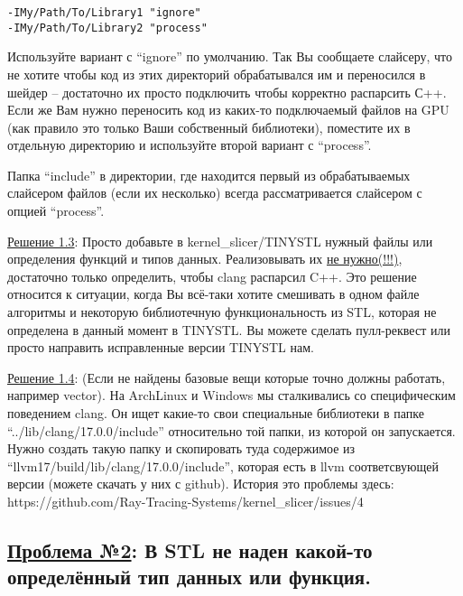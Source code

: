 \documentclass[11pt,fleqn,english,russian]{report} %
\begin{document}
\begin{lstlisting}[caption=добавляем новый подключаемый файл, 
	label=lst:addincludes]	
-IMy/Path/To/Library1 "ignore"
-IMy/Path/To/Library2 "process"
\end{lstlisting}

Используйте вариант с ``ignore'' по умолчанию. Так Вы сообщаете слайсеру, что не хотите чтобы код из этих директорий обрабатывался им и переносился в шейдер -- достаточно их просто подключить чтобы корректно распарсить С++. Если же Вам нужно переносить код из каких-то подключаемый файлов на GPU (как правило это только Ваши собственный библиотеки), поместите их в отдельную директорию и используйте второй вариант с ``process''.

\begin{remark}
Папка ``include'' в директории, где находится первый из обрабатываемых слайсером файлов (если их несколько) всегда рассматривается слайсером с опцией ``process''.
\end{remark}

\vspace*{5px}
\noindent\underline{Решение 1.3}: Просто добавьте в kernel\_slicer/TINYSTL нужный файлы или определения функций и типов данных. Реализовывать их \underline{не нужно(!!!)}, достаточно только определить, чтобы clang распарсил C++. Это решение относится к ситуации, когда Вы всё-таки хотите смешивать в одном файле алгоритмы и некоторую библиотечную функциональность из STL, которая не определена в данный момент в TINYSTL. Вы можете сделать пулл-реквест или просто направить исправленные версии TINYSTL нам.

\vspace*{5px}
\noindent\underline{Решение 1.4}: (Если не найдены базовые вещи которые точно должны работать, например vector). На ArchLinux и Windows мы сталкивались со специфическим поведением clang. Он ищет какие-то свои специальные библиотеки в папке ``../lib/clang/17.0.0/include'' относительно той папки, из которой он запускается. Нужно создать такую папку и скопировать туда содержимое из ``llvm17/build/lib/clang/17.0.0/include'', которая есть в llvm соответсвующей версии (можете скачать у них с github). История это проблемы здесь: https://github.com/Ray-Tracing-Systems/kernel\_slicer/issues/4

\subsection{\underline{Проблема №2}: В STL не наден какой-то определённый тип данных или функция.}
\end{document}
